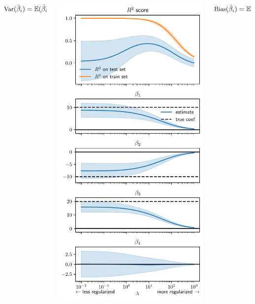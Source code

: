 \documentclass[presentation,mathserif,table]{beamer}
\begin{document}
\begin{frame}[label={sec:org42755c8}]{}
\begin{columns}
\begin{column}{.33\columnwidth}
\(\small{ \text{Var}(\hat{\beta}_i) = \mathbb{E}(\hat{\beta}_i  - \mathbb{E}(\hat{\beta}_i))^2}\)
\end{column}

\begin{column}{.38\columnwidth}
\begin{center}
\includegraphics[height=\textheight]{ridge_regularization_path.pdf}
\end{center}
\end{column}
\begin{column}{.3\columnwidth}
\(\small \text{Bias}(\hat{\beta}_i) = \mathbb{E}(\hat{\beta}_i) - \beta_i\)
\end{column}
\end{columns}
\end{frame}
\end{document}
